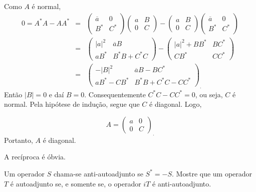 \documentclass[11pt,a4paper]{article}
\begin{document}
{Como $A$ é normal,
\[
\begin{array}{rcl}
0 = A^*A-AA^* &=& \begin{pmatrix}
\overline{a} & 0\\ 
B^* & C^*
\end{pmatrix}\begin{pmatrix}
a & B\\ 
0 & C
\end{pmatrix} - \begin{pmatrix}
a & B\\ 
0 & C
\end{pmatrix}\begin{pmatrix}
\overline{a} & 0\\ 
B^* & C^*
\end{pmatrix} \\
&=& \begin{pmatrix}
|a|^2 & \overline{a}B\\ 
aB^* & B^*B + C^*C
\end{pmatrix} - \begin{pmatrix}
|a|^2 + BB^* & BC^*\\ 
CB^* & CC^*
\end{pmatrix} \\
&=& \begin{pmatrix}
-|B|^2 & \overline{a}B-BC^*\\ 
aB^*-CB^* & B^*B + C^*C-CC^*
\end{pmatrix}_.
\end{array}
\]
Então $|B| = 0$ e daí $B=0$. Consequentemente $C^*C-CC^* = 0$, ou seja, $C$ é normal. Pela hipótese de indução, segue que $C$ é diagonal. Logo,

$$ A = \begin{pmatrix}
a & 0\\ 
0 & C
\end{pmatrix}_.$$
Portanto, $A$ é diagonal.

A recíproca é óbvia.

}

\begin{exercicio}
Um operador $S$ chama-se anti-autoadjunto se $S^{*} = -S.$ Mostre que um operador $T$ é autoadjunto se, e somente se, o operador $iT$ é anti-autoadjunto.
\end{exercicio}
\end{document}
